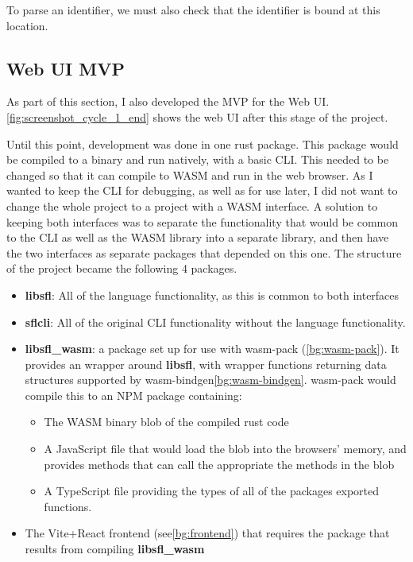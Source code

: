 To parse an identifier, we must also check that the identifier is bound at this location.

\subsection{Web UI \ac{MVP}}
As part of this section, I also developed the MVP for the Web UI.\ref{fig:screenshot_cycle_1_end} shows the web UI after this stage of the project. 

Until this point, development was done in one rust package. This package would be compiled to a binary and run natively, with a basic \ac{CLI}. This needed to be changed so that it can compile to \ac{WASM} and run in the web browser. As I wanted to keep the \ac{CLI} for debugging, as well as for use later, I did not want to change the whole project to a project with a \ac{WASM} interface. A solution to keeping both interfaces was to separate the functionality that would be common to the \ac{CLI} as well as the \ac{WASM} library into a separate library, and then have the two interfaces as separate packages that depended on this one. The structure of the project became the following 4 packages. 

\begin{itemize}
    \item \textbf{libsfl}: All of the language functionality, as this is common to both interfaces
    \item \textbf{sflcli}: All of the original CLI functionality without the language functionality.  
    \item \textbf{libsfl\_wasm}: a package set up for use with wasm-pack (\ref{bg:wasm-pack}). It provides an wrapper around \textbf{libsfl}, with wrapper functions returning data structures supported by wasm-bindgen\ref{bg:wasm-bindgen}. wasm-pack would compile this to an \ac{NPM} package containing:
    \begin{itemize}
        \item The WASM binary blob of the compiled rust code
        \item A JavaScript file that would load the blob into the browsers' memory, and provides methods that can call the appropriate the methods in the blob
        \item A TypeScript file providing the types of all of the packages exported functions. 
    \end{itemize}
    \item The Vite+React frontend (see\ref{bg:frontend}) that requires the package that results from compiling \textbf{libsfl\_wasm}
\end{itemize}


